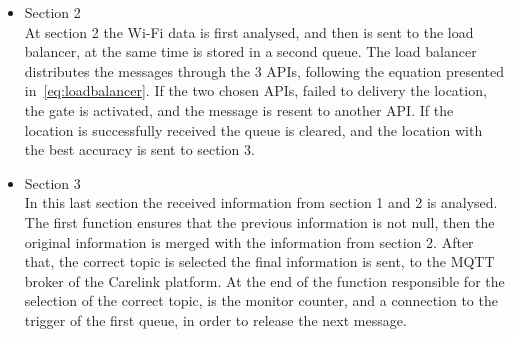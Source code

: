 \begin{itemize}
\begin{itemize}
\end{itemize}

\begin{itemize}
  \item Section 2\\
    At section 2 the Wi-Fi data is first analysed, and then is sent to the load balancer, at the same time is stored in a second queue. The load balancer distributes the messages through the 3 APIs, following the equation presented in~\ref{eq:loadbalancer}. If the two chosen APIs, failed to delivery the location, the gate is activated, and the message is resent to another API. If the location is successfully received the queue is cleared, and the location with the best accuracy is sent to section 3.

\end{itemize}

\begin{itemize}
  \item Section 3\\
  In this last section the received information from section 1 and 2 is analysed. The first function ensures that the previous information is not null, then the original information is merged  with the information from section 2. After that, the correct topic is selected  the final information is sent, to the MQTT broker of the Carelink platform. At the end of the function responsible for the selection of the correct topic, is the monitor counter, and a connection to the trigger of the first queue, in order to release the next message.

\end{itemize}

\end{itemize}



